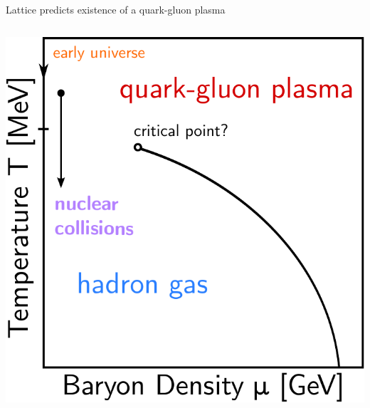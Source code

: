 \documentclass{beamer}
\begin{document}
\begin{frame}{Lattice predicts existence of a quark-gluon plasma}
\begin{columns}
\begin{column}{0.4\textwidth}
        \includegraphics[width=\columnwidth]{phasediagram}
    \end{column}
  \end{columns}
\end{frame}
\end{document}
